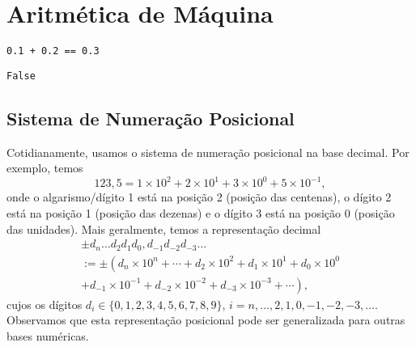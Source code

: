 
\chapter{Aritmética de Máquina}\label{cap_aritm}

\begin{lstlisting}
0.1 + 0.2 == 0.3
\end{lstlisting}

\begin{verbatim}
False
\end{verbatim}

\section{Sistema de Numeração Posicional}\label{cap_aritm_sec_sisnumpos}

Cotidianamente, usamos o sistema de numeração posicional na base decimal. Por exemplo, temos
\begin{equation}
  123,5 = 1\times 10^2 + 2\times 10^1 + 3\times 10^0 + 5\times 10^{-1},
\end{equation}
onde o algarismo/dígito 1 está na posição 2 (posição das centenas), o dígito 2 está na posição 1 (posição das dezenas) e o dígito 3 está na posição 0 (posição das unidades). Mais geralmente, temos a representação decimal
\begin{gather}
  \pm d_n\ldots d_2d_1d_0,d_{-1}d_{-2}d_{-3}\ldots \\
  := \pm \left(d_n\times 10^n + \cdots + d_2\times 10^2 + d_1\times 10^1 + d_0\times 10^0\right. \\
      \left. + d_{-1}\times 10^{-1} + d_{-2}\times 10^{-2} + d_{-3}\times 10^{-3} + \cdots\right),
\end{gather}
cujos os dígitos $d_i \in \{0, 1, 2, 3, 4, 5, 6, 7, 8, 9\}$, $i=n, \dotsc, 2, 1, 0, -1, -2, -3, \ldots$. Observamos que esta representação posicional pode ser generalizada para outras bases numéricas.


